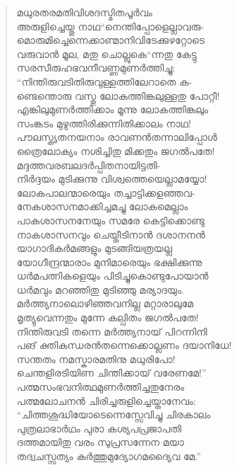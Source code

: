 \begin{verse}
മധുരതരമതിവിശദസ്മിതപൂര്‍വം\\
അരുളിച്ചെയ്തു നാഥ“നെന്തിപ്പോളെല്ലാവരു-\\
മൊരുമിച്ചെന്നെക്കാണ്മാനിവിടേക്കുഴറ്റോടെ\\
വരുവാന്‍ മൂല, മതു ചൊല്ലുകെ“ന്നതു കേട്ടു\\
സരസീരുഹഭവനീവണ്ണമുണര്‍ത്തിച്ചു:\\
“നിന്തിരുവടിതിരുവുള്ളത്തിലേറാതെ ക-\\
ണ്ടെന്തൊരു വസ്തു ലോകത്തിങ്കലുള്ളതു പോറ്റീ!\\
എങ്കിലുമുണര്‍ത്തിക്കാം മൂന്നു ലോകത്തിങ്കലും\\
സംങ്കടം മുഴുത്തിരിക്കുന്നിതിക്കാലം നാഥ!\\
പൗലസ്ത്യതനയനാം രാവണന്‍തന്നാലിപ്പോള്‍\\
ത്രൈലോക്യം നശിച്ചിതു മിക്കതും ജഗല്‍പതേ!\\
മദ്ദത്തവരബലദര്‍പ്പിതനായിട്ടതി-\\
നിര്‍ദ്ദയം മുടിക്കുന്നു വിശ്വത്തെയെല്ലാമയ്യോ!\\
ലോകപാലന്മാരെയും തച്ചാട്ടിക്കളഞ്ഞവ-\\
നേകശാസനമാക്കിച്ചമച്ചു ലോകമെല്ലാം\\
പാകശാസനനേയും സമരേ കെട്ടിക്കൊണ്ടു\\
നാകശാസനവും ചെയ്തീടിനാന്‍ ദശാനനന്‍\\
യാഗാദികര്‍മങ്ങളും മുടങ്ങിയത്രയല്ല\\
യോഗീന്ദ്രന്മാരാം മുനിമാരെയും ഭക്ഷിക്കുന്നു\\
ധര്‍മപത്നികളെയും പിടിച്ചുകൊണ്ടുപോയാന്‍\\
ധര്‍മവും മറഞ്ഞിതു മുടിഞ്ഞു മര്യാദയും.\\
മര്‍ത്ത്യനാലൊഴിഞ്ഞവനില്ല മറ്റാരാലുമേ\\
മൃത്യുവെന്നതും മുന്നേ കല്പിതം ജഗല്‍പതേ!\\
നിന്തിരുവടി തന്നെ മര്‍ത്ത്യനായ് പിറന്നിനി\\
പങ് ക്തികന്ധരന്‍തന്നെക്കൊല്ലണം ദയാനിധേ!\\
സന്തതം നമസ്കാരമതിനു മധുരിപോ!\\
ചെന്തളിരടിയിണ ചിന്തിക്കായ് വരേണമേ!”\\
പത്മസംഭവനിത്ഥമുണര്‍ത്തിച്ചതുനേരം\\
പത്മലോചനന്‍ ചിരിച്ചരുളിച്ചെയ്താനേവം:\\
“ചിത്തശുദ്ധിയോടെന്നെസ്സേവിച്ചു ചിരകാലം\\
പുത്രലാഭാര്‍ഥം പുരാ കശ്യപപ്രജാപതി\\
ദത്തമായിതു വരം സുപ്രസന്നേന മയാ\\
തദ്വചസ്സത്യം കര്‍ത്തുമുദ്യോഗമദ്യൈവ മേ.”\\

\end{verse}
